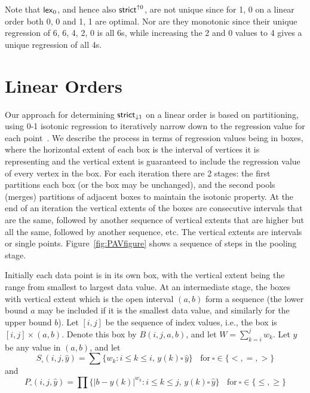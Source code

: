 \documentclass[11pt]{article}
\newcommand{\Strictdown}[2]{\ensuremath{\mathsf{strict}_{\downarrow{#1}}\ifthenelse{\equal{#2}{}}{}{(#2)}}}
\newcommand{\Strictup}[2]{\ensuremath{\mathsf{strict}^{\uparrow {#1}}\ifthenelse{\equal{#2}{}}{}{(#2)}}}
\newcommand{\lex}[2]{\ensuremath{\mathsf{lex}_{#1} \ifthenelse{\equal{#2}{}}{}{(#2)}}}
\begin{document}
Note that \lex{0}{}, and hence also \Strictup{0}{}, are not unique since for 1, 0 on a linear order both 0, 0 and 1, 1 are optimal.
Nor are they monotonic since their unique regression of 6, 6, 4, 2, 0 is all 6s, while increasing the 2 and 0 values to 4 gives a unique regression of all 4s.



\section{Linear Orders} \label{sec:linear}


Our approach for determining \Strictdown{1}{} on a linear order is based on partitioning, using 0-1 isotonic regression to iteratively narrow down to the regression value for each point~\cite{QPartition}.
We describe the process in terms of regression values being in boxes, where the horizontal extent of each box is the interval of vertices it is representing and the vertical extent is guaranteed to include the regression value of every vertex in the box.
For each iteration there are 2 stages: the first partitions each box (or the box may be unchanged), and the second pools (merges) partitions of adjacent boxes to maintain the isotonic property. 
At the end of an iteration the vertical extents of the boxes are consecutive intervals that are the same, followed by another sequence of vertical extents that are higher but all the same, followed by another sequence, etc.
The vertical extents are intervals or single points.
Figure~\ref{fig:PAVfigure} shows a sequence of steps in the pooling stage.


Initially each data point is in its own box, with the vertical extent being the range from smallest to largest data value.
At an intermediate stage, the boxes with vertical extent which is the open interval $(a,b)$ form a sequence (the lower bound $a$ may be included if it is the smallest data value, and similarly for the upper bound $b$).
Let $[i,j]$ be the sequence of index values, i.e., the box is $[i,j] \times (a,b)$.
Denote this box by $B(i,j,a,b)$, and let $W = \sum_{k=i}^j w_k$. 
Let $\hat{y}$ be any value in $(a,b)$, and let
$$
S_\square(i,j,\hat{y}) = \sum \{w_k: i \!\leq\! k \!\leq\! i,\, y(k) \square\, \hat{y}\}~~~~ \mathrm{for~} \square \in \{<, =, >\}
$$
and
$$
P_\square(i,j,\hat{y}) = \prod \{|b-y(k)|^{w_k}: i \!\leq k \!\leq j,\, y(k) \square\, \hat{y}\} ~~~~ \mathrm{for~} \square \in \{ \leq, \geq\}
$$
\end{document}
